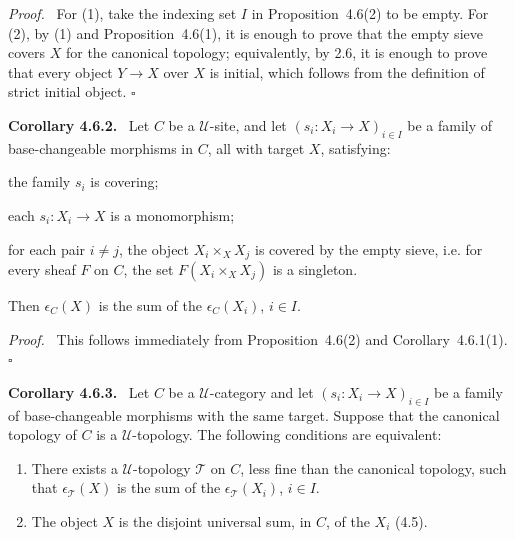 \documentclass[11pt]{article}
\newcommand{\U}{\mathcal{U}}
\newcommand{\qedtext}{\hfill\(\square\)}
\newenvironment{statement}[1]{\par\medskip\noindent\textbf{#1.}\ }{\par\medskip}
\newenvironment{prooftext}{\par\noindent\emph{Proof.}\ }{\par\medskip}
\begin{document}
\begin{prooftext}
For (1), take the indexing set \(I\) in Proposition~4.6(2) to be empty. For (2), by (1) and Proposition~4.6(1), it is enough to prove that the empty sieve covers \(X\) for the canonical topology; equivalently, by 2.6, it is enough to prove that every object \(Y\to X\) over \(X\) is initial, which follows from the definition of strict initial object. \qedtext
\end{prooftext}

\begin{statement}{Corollary 4.6.2}
Let \(C\) be a \(\U\)-site, and let \((s_i:X_i\to X)_{i\in I}\) be a family of base-changeable morphisms in \(C\), all with target \(X\), satisfying:
\begin{description}[leftmargin=2.5em]
\item[\(\alpha\)] the family \(s_i\) is covering;
\item[\(\beta\)] each \(s_i:X_i\to X\) is a monomorphism;
\item[\(\gamma\)] for each pair \(i\ne j\), the object \(X_i\times_XX_j\) is covered by the empty sieve, i.e. for every sheaf \(F\) on \(C\), the set \(F(X_i\times_XX_j)\) is a singleton.
\end{description}
Then \(\epsilon_C(X)\) is the sum of the \(\epsilon_C(X_i)\), \(i\in I\).
\end{statement}

\begin{prooftext}
This follows immediately from Proposition~4.6(2) and Corollary~4.6.1(1). \qedtext
\end{prooftext}

\begin{statement}{Corollary 4.6.3}
Let \(C\) be a \(\U\)-category and let \((s_i:X_i\to X)_{i\in I}\) be a family of base-changeable morphisms with the same target. Suppose that the canonical topology of \(C\) is a \(\U\)-topology. The following conditions are equivalent:
\begin{enumerate}[label=(\roman*)]
\item There exists a \(\U\)-topology \(\mathcal T\) on \(C\), less fine than the canonical topology, such that \(\epsilon_{\mathcal T}(X)\) is the sum of the \(\epsilon_{\mathcal T}(X_i)\), \(i\in I\).
\item The object \(X\) is the disjoint universal sum, in \(C\), of the \(X_i\) (4.5).
\end{enumerate}
\end{statement}
\end{document}
